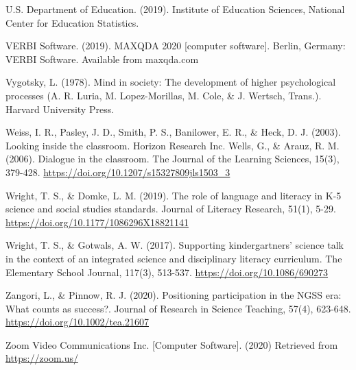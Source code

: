 \documentclass{sig-alternate} %
\begin{document}
U.S. Department of Education. (2019). Institute of Education Sciences, National Center for Education Statistics.

VERBI Software. (2019). MAXQDA 2020 [computer software]. Berlin, Germany: VERBI Software. Available from maxqda.com

Vygotsky, L. (1978). Mind in society: The development of higher psychological processes (A. R. Luria, M. Lopez-Morillas, M. Cole, \& J. Wertsch, Trans.). Harvard University Press.

Weiss, I. R., Pasley, J. D., Smith, P. S., Banilower, E. R., \& Heck, D. J. (2003). Looking inside the classroom. Horizon Research Inc.
Wells, G., \& Arauz, R. M. (2006). Dialogue in the classroom. The Journal of the Learning Sciences, 15(3), 379-428. \url{https://doi.org/10.1207/s15327809jls1503_3}

Wright, T. S., \& Domke, L. M. (2019). The role of language and literacy in K-5 science and social studies standards. Journal of Literacy Research, 51(1), 5-29. \url{https://doi.org/10.1177/1086296X18821141}

Wright, T. S., \& Gotwals, A. W. (2017). Supporting kindergartners’ science talk in the context of an integrated science and disciplinary literacy curriculum. The Elementary School Journal, 117(3), 513-537. \url{https://doi.org/10.1086/690273}

Zangori, L., \& Pinnow, R. J. (2020). Positioning participation in the NGSS era: What counts as success?. Journal of Research in Science Teaching, 57(4), 623-648. \url{https://doi.org/10.1002/tea.21607}

Zoom Video Communications Inc. [Computer Software]. (2020) Retrieved from \url{https://zoom.us/}
\end{document}
